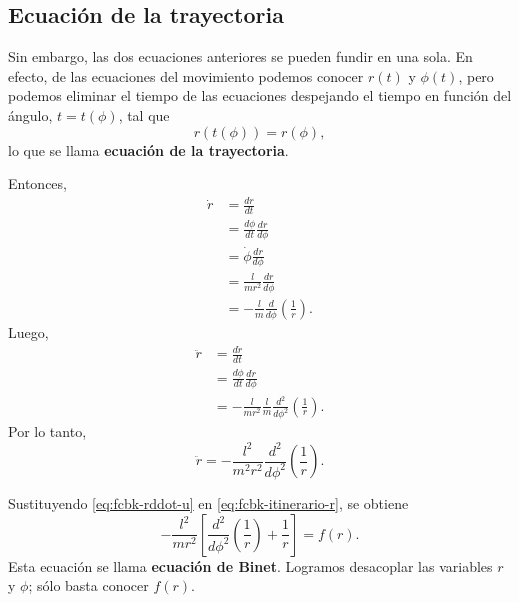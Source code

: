 \documentclass[../apunte_mecanica_clasica.tex]{subfiles}%
\begin{document}
\subsection{Ecuación de la trayectoria}

Sin embargo, las dos ecuaciones anteriores se pueden fundir en una sola. En efecto, de las ecuaciones del movimiento podemos conocer $r(t)$ y $\phi(t)$, pero podemos eliminar el tiempo de las ecuaciones despejando el tiempo en función del ángulo, $t=t(\phi)$, tal que
\begin{equation}
    r(t(\phi))=r(\phi),
    \label{eq:fcbk-r-de-phi}
\end{equation}
lo que se llama \textbf{ecuación de la trayectoria}.

Entonces,
\begin{equation}
    \begin{aligned}
    \dot r
    &=\frac{dr}{dt}\\
    &=\frac{d\phi}{dt}\frac{dr}{d\phi}\\
    &=\dot\phi\frac{dr}{d\phi}\\
    &=\frac{l}{mr^2}\frac{dr}{d\phi}\\
    &=-\frac{l}{m}\frac{d}{d\phi}\left(\frac{1}{r}\right).
    \end{aligned}
    \label{eq:fcbk-rdot-u}
\end{equation}
Luego,
\begin{equation}
    \begin{aligned}
    \ddot r
    &=\frac{d\dot r}{dt}\\
    &=\frac{d\phi}{dt}\frac{d\dot r}{d\phi}\\
    &=-\frac{l}{mr^2}\frac{l}{m}\frac{d^2}{d\phi^2}\left(\frac{1}{r}\right).
    \end{aligned}
    \label{eq:fcbk-rddot-u-intermedio}
\end{equation}
Por lo tanto,
\begin{equation}
    \ddot r=-\frac{l^2}{m^2r^2}\frac{d^2}{d\phi^2}\left(\frac{1}{r}\right).
    \label{eq:fcbk-rddot-u}
\end{equation}

Sustituyendo \eqref{eq:fcbk-rddot-u} en \eqref{eq:fcbk-itinerario-r}, se obtiene
\begin{equation}
    -\frac{l^2}{mr^2}\left[\frac{d^2}{d\phi^2}\left(\frac{1}{r}\right)+\frac{1}{r}\right]=f(r).
    \label{eq:fcbk-binet}
\end{equation}
Esta ecuación se llama \textbf{ecuación de Binet}. Logramos desacoplar las variables $r$ y $\phi$; sólo basta conocer $f(r)$.
\end{document}
